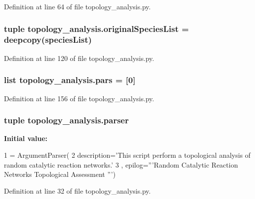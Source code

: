 Definition at line 64 of file topology\-\_\-analysis.\-py.

\hypertarget{a00128_a62b034cfe14eff36f09dd65a51ae7c9c}{
\subsubsection[{original\-Species\-List}]{\setlength{\rightskip}{0pt plus 5cm}tuple topology\-\_\-analysis.\-original\-Species\-List = deepcopy({\bf species\-List})}}\label{a00128_a62b034cfe14eff36f09dd65a51ae7c9c}


Definition at line 120 of file topology\-\_\-analysis.\-py.

\hypertarget{a00128_a516f339905d01b02a4e16181f2fde4be}{
\subsubsection[{pars}]{\setlength{\rightskip}{0pt plus 5cm}list topology\-\_\-analysis.\-pars = \mbox{[}0\mbox{]}}}\label{a00128_a516f339905d01b02a4e16181f2fde4be}


Definition at line 156 of file topology\-\_\-analysis.\-py.

\hypertarget{a00128_aeff833532f5cd31a9720a78cc0f8d97b}{
\subsubsection[{parser}]{\setlength{\rightskip}{0pt plus 5cm}tuple topology\-\_\-analysis.\-parser}}\label{a00128_aeff833532f5cd31a9720a78cc0f8d97b}
{\bfseries Initial value\-:}
\begin{DoxyCode}
1 = ArgumentParser(
2                                 description=\textcolor{stringliteral}{'This script perform a topological analysis of random catalytic
       reaction networks.'}
3                                 , epilog=\textcolor{stringliteral}{'''Random Catalytic Reaction Networks Topological Assessment '''})
\end{DoxyCode}


Definition at line 32 of file topology\-\_\-analysis.\-py.

